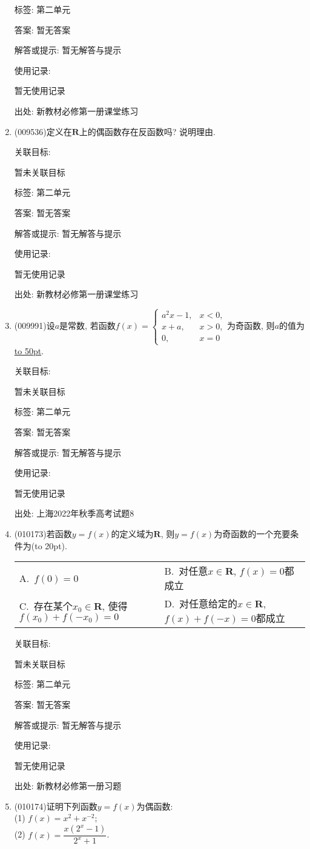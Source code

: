 \documentclass[10pt,a4paper]{article}
\newcommand{\blank}[1]{\underline{\hbox to #1pt{}}}
\newcommand{\bracket}[1]{(\hbox to #1pt{})}
\newcommand{\twoch}[4]{\par\begin{tabular}{p{.46\textwidth}p{.46\textwidth}}
A.~#1& B.~#2\\
C.~#3& D.~#4
\end{tabular}}
\begin{document}
\begin{enumerate}[1.]
标签: 第二单元

答案: 暂无答案

解答或提示: 暂无解答与提示

使用记录:

暂无使用记录


出处: 新教材必修第一册课堂练习
\item { (009536)}定义在$\mathbf{R}$上的偶函数存在反函数吗? 说明理由.


关联目标:

暂未关联目标



标签: 第二单元

答案: 暂无答案

解答或提示: 暂无解答与提示

使用记录:

暂无使用记录


出处: 新教材必修第一册课堂练习
\item { (009991)}设$a$是常数, 若函数$f(x)=\begin{cases} a^2x-1, & x<0, \\ x+a, & x>0, \\ 0, & x=0 \end{cases}$为奇函数, 则$a$的值为\blank{50}.


关联目标:

暂未关联目标



标签: 第二单元

答案: 暂无答案

解答或提示: 暂无解答与提示

使用记录:

暂无使用记录


出处: 上海2022年秋季高考试题8
\item { (010173)}若函数$y=f(x)$的定义域为$\mathbf{R}$, 则$y=f(x)$为奇函数的一个充要条件为\bracket{20}.
\twoch{$f(0)=0$}{对任意$x\in \mathbf{R}$, $f(x)=0$都成立}{存在某个$x_0\in \mathbf{R}$, 使得$f(x_0)+f(-x_0)=0$}{对任意给定的$x\in \mathbf{R}$, $f(x)+f(-x)=0$都成立}


关联目标:

暂未关联目标



标签: 第二单元

答案: 暂无答案

解答或提示: 暂无解答与提示

使用记录:

暂无使用记录


出处: 新教材必修第一册习题
\item { (010174)}证明下列函数$y=f(x)$为偶函数:\\
(1) $f(x)=x^2+x^{-2}$;\\
(2) $f(x)=\dfrac{x(2^x-1)}{2^x+1}$.



\end{enumerate}
\end{document}
